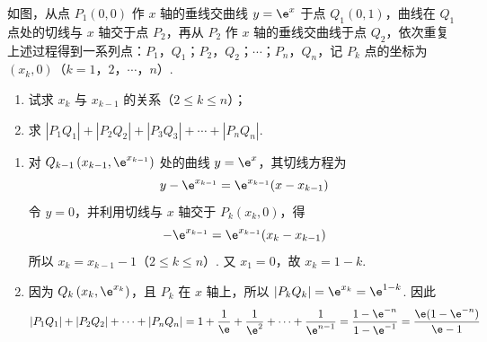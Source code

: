 \begin{problem}
如图，从点 \(P_{1}(0,0)\) 作 \(x\) 轴的垂线交曲线 \(y = \e^{x}\) 于点 \(Q_{1}(0,1)\)，曲线在 \(Q_{1}\) 点处的切线与 \(x\) 轴交于点 \(P_{2}\)，再从 \(P_{2}\) 作 \(x\) 轴的垂线交曲线于点 \(Q_{2}\)，依次重复上述过程得到一系列点：\(P_{1}\)，\(Q_{1}\)；\(P_{2}\)，\(Q_{2}\)；\(\cdots\)；\(P_{n}\)，\(Q_{n}\)，记 \(P_{k}\) 点的坐标为 \((x_{k}, 0)\)（\(k = 1\)，\(2\)，\(\cdots\)，\(n\)）.
\begin{enumerate}
\item 试求 \(x_{k}\) 与 \(x_{k-1}\) 的关系（\(2 \leqslant k \leqslant n\)）；
\item 求 \(\left|P_{1}Q_{1}\right|+\left|P_{2}Q_{2}\right|+\left|P_{3}Q_{3}\right|+\cdots+\left|P_{n}Q_{n}\right|\).
\end{enumerate}

\end{problem}

\begin{solution}
\begin{enumerate}
\item 对 \(Q_{k-1}\left(x_{k-1},\e^{x_{k-1}}\right)\) 处的曲线 \(y=\e^{x}\)，其切线方程为
\[
y-\e^{x_{k-1}}=\e^{x_{k-1}}(x-x_{k-1})
\]
令 \(y=0\)，并利用切线与 \(x\) 轴交于 \(P_k(x_k,0)\)，得
\[
-\e^{x_{k-1}}=\e^{x_{k-1}}(x_k-x_{k-1})
\]
所以 \(x_k=x_{k-1}-1\)（\(2\leqslant k\leqslant n\)）. 又 \(x_1=0\)，故 \(x_k=1-k\).
\item 因为 \(Q_k\left(x_k,\e^{x_k}\right)\)，且 \(P_k\) 在 \(x\) 轴上，所以 \(|P_kQ_k|=\e^{x_k}=\e^{1-k}\). 因此
\[
|P_1Q_1|+|P_2Q_2|+\cdots+|P_nQ_n|=1+\frac{1}{\e}+\frac{1}{\e^{2}}+\cdots+\frac{1}{\e^{n-1}}=\frac{1-\e^{-n}}{1-\e^{-1}}=\frac{\e(1-\e^{-n})}{\e-1}
\]
\end{enumerate}
\end{solution}

